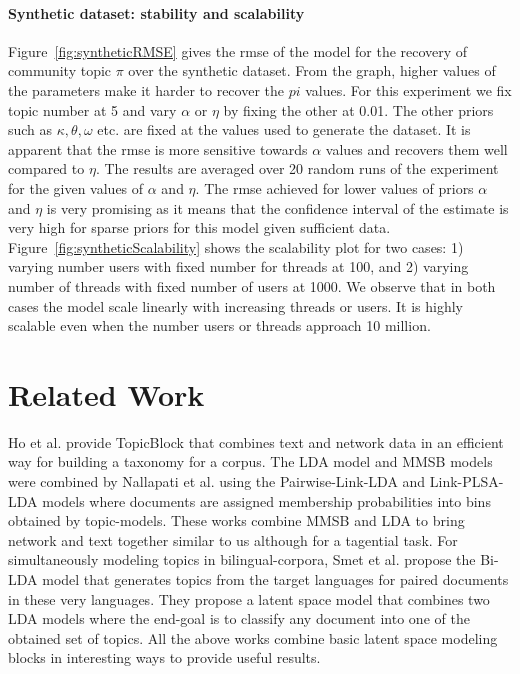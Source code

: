 \documentclass{sig-alternate}
\newcommand{\abhi}[1]{\textcolor{blue}{\\ abhi-comment: #1}}
\begin{document}
\paragraph{Synthetic dataset: stability and scalability}
Figure~\ref{fig:syntheticRMSE} gives the rmse of the model for the recovery of
community topic $\pi$ over the synthetic dataset. From the graph, higher values
of the parameters make it harder to recover the $pi$ values. For this experiment
we fix topic number at 5 and vary $\alpha$ or $\eta$ by fixing the other at
0.01. The other priors such as $\kappa, \theta,
\omega$ etc. are fixed at the values used to generate the dataset.  
It is apparent that the rmse is more sensitive towards $\alpha$ values and
recovers them well compared to $\eta$. The results are averaged over 20 random
runs of the experiment for the given values of $\alpha$ and $\eta$. The rmse
achieved for lower values of priors $\alpha$ and $\eta$ is very promising as
it means that the confidence interval of the estimate is very high for sparse
priors for this model given sufficient data. 
Figure~\ref{fig:syntheticScalability} shows the scalability plot for two cases:
1) varying number users with fixed number for threads at 100, and 2) varying number of 
threads with fixed number of users at 1000. We observe that in both cases 
the model scale linearly with increasing threads or users. It is highly scalable 
even when the number users or threads approach 10 million. 


\section{Related Work}

Ho et al.
\cite{Ho:2012:DHT:2187836.2187936} provide TopicBlock that combines text and
network data in an efficient way for building a taxonomy for a corpus.
The LDA model and MMSB models were combined by
Nallapati et al. \cite{Nallapati:2008:JLT:1401890.1401957} using the
Pairwise-Link-LDA and Link-PLSA-LDA models where documents are assigned
membership probabilities into bins obtained by topic-models. These works 
combine MMSB and LDA to bring network and text together similar to us 
although for a tagential task. 
For simultaneously modeling topics in bilingual-corpora, Smet et al.
\cite{Smet:2011:KTA:2017863.2017915} propose the Bi-LDA model that generates
topics from the target languages for paired documents in these very languages.
They propose a latent space model that combines two LDA models 
where the end-goal is to classify any document into one of the
obtained set of topics. All the above works combine basic latent space modeling
blocks in interesting ways to provide useful results.  
\end{document}
